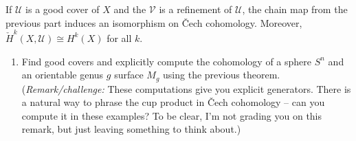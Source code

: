 \documentclass[12pt]{article}
\begin{document}
\begin{problem}{4}
    \begin{theorem} 
    If $\mathcal{U}$ is a good cover of $X$ and the $\mathcal{V}$ is a refinement of $\mathcal{U}$, the chain map from the previous part induces an isomorphism on \v{C}ech cohomology. Moreover, $\check{H}^k(X, \mathcal{U}) \cong H^k(X)$ for all $k$. 
    \end{theorem} 

    \begin{enumerate}[resume]
        \item Find good covers and explicitly compute the cohomology of a sphere $S^n$ and an orientable genus $g$ surface $M_g$ using the previous theorem. \\
        (\emph{Remark/challenge:} These computations give you explicit generators. There is a natural way to phrase the cup product in \v{C}ech cohomology -- can you compute it in these examples? To be clear, I'm not grading you on this remark, but just leaving something to think about.)
    \end{enumerate}
    
\end{problem}
\end{document}

